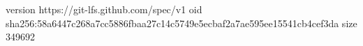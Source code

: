 version https://git-lfs.github.com/spec/v1
oid sha256:58a6447c268a7cc5886fbaa27c14c5749e5ecbaf2a7ae595ee15541cb4cef3da
size 349692
